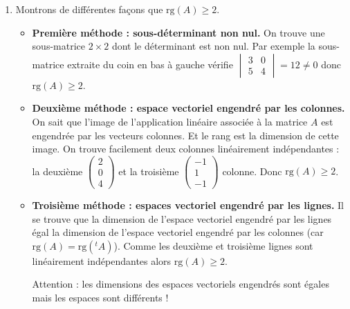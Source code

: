 \documentclass[11pt,a4paper]{article}
\renewcommand{\ge}{\geqslant} \renewcommand{\geq}{\geqslant}
\begin{document}
\begin{enumerate}
  \item Montrons de différentes façons que $\textrm{rg}(A)\ge 2$.
  \begin{itemize}
     \item \textbf{Première méthode : sous-déterminant non nul.}
On trouve une sous-matrice $2\times 2$ dont le déterminant est non nul.
Par exemple la sous-matrice extraite du coin en bas à gauche vérifie
$\begin{vmatrix}3 & 0\\ 5 & 4\end{vmatrix}= 12 \neq 0$ donc $\textrm{rg}(A)\ge 2$.

     \item \textbf{Deuxième méthode : espace vectoriel engendré par les colonnes.}
On sait que l'image de l'application linéaire associée à la matrice $A$
est engendrée par les vecteurs colonnes. Et le rang est la dimension de cette image.
On trouve facilement deux colonnes linéairement indépendantes : 
la deuxième $\begin{pmatrix}2\\0\\4\end{pmatrix}$
et la troisième $\begin{pmatrix}-1\\1\\-1\end{pmatrix}$ colonne.
Donc $\textrm{rg}(A)\ge 2$.

     \item \textbf{Troisième méthode : espaces vectoriel engendré par les lignes.}
Il se trouve que la dimension de l'espace vectoriel engendré par les lignes
égal la dimension de l'espace vectoriel engendré par les colonnes (car $\textrm{rg}(A)=\textrm{rg}({}^tA)$).
Comme les deuxième et troisième lignes sont linéairement indépendantes alors
$\textrm{rg}(A)\ge 2$. 

Attention : les dimensions des espaces vectoriels engendrés sont égales mais les espaces sont différents !
  \end{itemize}


\end{enumerate}
\end{document}
